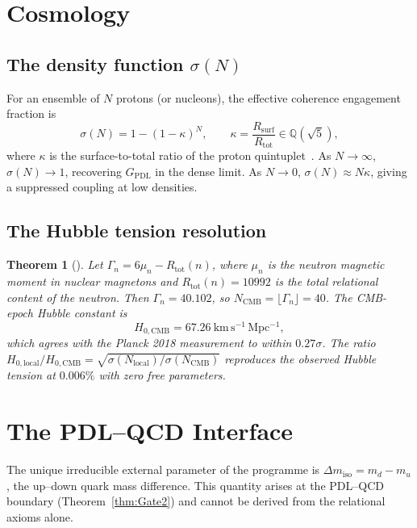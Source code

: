 \documentclass[11pt,a4paper]{article}
\theoremstyle{plain}
\newtheorem{theorem}{Theorem}[section]
\theoremstyle{definition}
\theoremstyle{remark}
\newcommand{\GPDL}{G_{\mathrm{PDL}}}
\newcommand{\Rsurf}{R_{\mathrm{surf}}}
\newcommand{\Rtot}{R_{\mathrm{tot}}}
\begin{document}
\section{Cosmology}
\label{sec:cosmology}

\subsection{The density function \texorpdfstring{$\sigma(N)$}{sigma(N)}}
\label{subsec:sigma}

For an ensemble of $N$ protons (or nucleons), the effective coherence engagement fraction is
\[
\sigma(N) = 1 - (1-\kappa)^N, \qquad \kappa = \frac{\Rsurf}{\Rtot} \in \mathbb{Q}(\sqrt{5}),
\]
where $\kappa$ is the surface-to-total ratio of the proton quintuplet~\citep{D24,D26}.
As $N\to\infty$, $\sigma(N)\to 1$, recovering $\GPDL$ in the dense limit.
As $N\to 0$, $\sigma(N)\approx N\kappa$, giving a suppressed coupling at low densities.

\subsection{The Hubble tension resolution}
\label{subsec:hubble}

\begin{theorem}[\citep{D27,D35}]
\label{thm:hubble}
Let $\Gamma_n = 6\mu_n - \Rtot(n)$, where $\mu_n$ is the neutron magnetic moment in nuclear magnetons and $\Rtot(n)=10992$ is the total relational content of the neutron.
Then $\Gamma_n = 40.102$, so $N_{\mathrm{CMB}} = \lfloor\Gamma_n\rfloor = 40$.
The CMB-epoch Hubble constant is
\[
H_{0,\mathrm{CMB}} = 67.26~\mathrm{km\,s^{-1}\,Mpc^{-1}},
\]
which agrees with the Planck 2018 measurement to within $0.27\sigma$.
The ratio $H_{0,\mathrm{local}}/H_{0,\mathrm{CMB}} = \sqrt{\sigma(N_{\mathrm{local}})/\sigma(N_{\mathrm{CMB}})}$ reproduces the observed Hubble tension at $0.006\%$ with zero free parameters.
\end{theorem}

\section{The PDL--QCD Interface}
\label{sec:QCD}

The unique irreducible external parameter of the programme is $\Delta m_{\mathrm{iso}} = m_d - m_u$, the up--down quark mass difference.
This quantity arises at the PDL--QCD boundary (Theorem~\ref{thm:Gate2}) and cannot be derived from the relational axioms alone.
\end{document}
